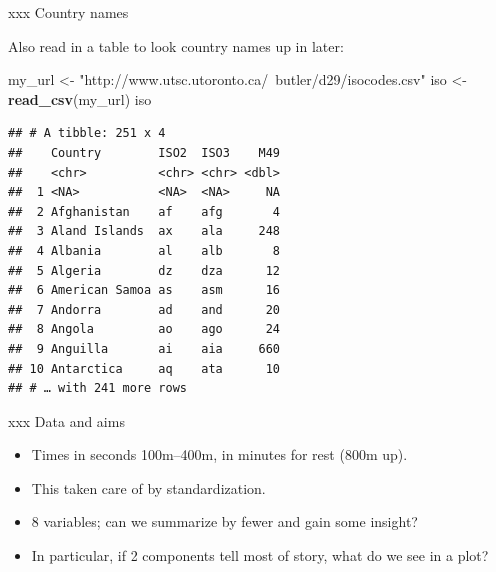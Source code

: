 \documentclass[ignorenonframetext,]{beamer}
\newenvironment{Shaded}{\begin{snugshade}}{\end{snugshade}}
\newcommand{\KeywordTok}[1]{\textcolor[rgb]{0.13,0.29,0.53}{\textbf{#1}}}
\newcommand{\NormalTok}[1]{#1}
\newcommand{\StringTok}[1]{\textcolor[rgb]{0.31,0.60,0.02}{#1}}
\begin{document}
\begin{frame}[fragile]{xxx Country names}
\protect\hypertarget{xxx-country-names}{}

Also read in a table to look country names up in later:

\begin{Shaded}
\begin{Highlighting}[]
\NormalTok{my_url <-}\StringTok{ "http://www.utsc.utoronto.ca/~butler/d29/isocodes.csv"}
\NormalTok{iso <-}\StringTok{ }\KeywordTok{read_csv}\NormalTok{(my_url)}
\NormalTok{iso}
\end{Highlighting}
\end{Shaded}

\begin{verbatim}
## # A tibble: 251 x 4
##    Country        ISO2  ISO3    M49
##    <chr>          <chr> <chr> <dbl>
##  1 <NA>           <NA>  <NA>     NA
##  2 Afghanistan    af    afg       4
##  3 Aland Islands  ax    ala     248
##  4 Albania        al    alb       8
##  5 Algeria        dz    dza      12
##  6 American Samoa as    asm      16
##  7 Andorra        ad    and      20
##  8 Angola         ao    ago      24
##  9 Anguilla       ai    aia     660
## 10 Antarctica     aq    ata      10
## # … with 241 more rows
\end{verbatim}

\end{frame}

\begin{frame}{xxx Data and aims}
\protect\hypertarget{xxx-data-and-aims}{}

\begin{itemize}
\item
  Times in seconds 100m--400m, in minutes for rest (800m up).
\item
  This taken care of by standardization.
\item
  8 variables; can we summarize by fewer and gain some insight?
\item
  In particular, if 2 components tell most of story, what do we see in a
  plot?
\end{itemize}

\end{frame}
\end{document}
